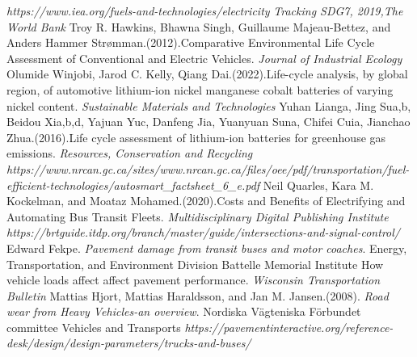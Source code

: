 \documentclass{article}
\begin{document}
\begin{thebibliography}{99}
\textit{https://www.iea.org/fuels-and-technologies/electricity}
\textit{Tracking SDG7, 2019,The World Bank}
Troy R. Hawkins, Bhawna Singh, Guillaume Majeau-Bettez, and Anders Hammer Strømman.(2012).Comparative Environmental Life Cycle Assessment of Conventional and Electric Vehicles. \textit{Journal of Industrial Ecology}
Olumide Winjobi, Jarod C. Kelly, Qiang Dai.(2022).Life-cycle analysis, by global region, of automotive lithium-ion nickel manganese cobalt batteries of varying nickel content. \textit{Sustainable Materials and Technologies}
Yuhan Lianga, Jing Sua,b, Beidou Xia,b,d, Yajuan Yuc, Danfeng Jia, Yuanyuan Suna, Chifei Cuia, Jianchao Zhua.(2016).Life cycle assessment of lithium-ion batteries for greenhouse gas emissions. \textit{Resources, Conservation and Recycling}
\textit{https://www.nrcan.gc.ca/sites/www.nrcan.gc.ca/files/oee/pdf/transportation/fuel-efficient-technologies/autosmart\_factsheet\_6\_e.pdf}
Neil Quarles, Kara M. Kockelman, and Moataz Mohamed.(2020).Costs and Benefits of Electrifying and Automating Bus Transit Fleets. \textit{Multidisciplinary Digital Publishing Institute}
\textit{https://brtguide.itdp.org/branch/master/guide/intersections-and-signal-control/}
Edward Fekpe. \textit{Pavement damage from transit buses and motor coaches}. Energy, Transportation, and Environment Division Battelle Memorial Institute
How vehicle loads affect affect pavement performance. \textit{Wisconsin Transportation Bulletin}
Mattias Hjort, Mattias Haraldsson, and Jan M. Jansen.(2008). \textit{Road wear from Heavy Vehicles-an overview}. Nordiska Vägteniska Förbundet committee Vehicles and Transports
\textit{https://pavementinteractive.org/reference-desk/design/design-parameters/trucks-and-buses/}
\end{thebibliography}
\end{document}
